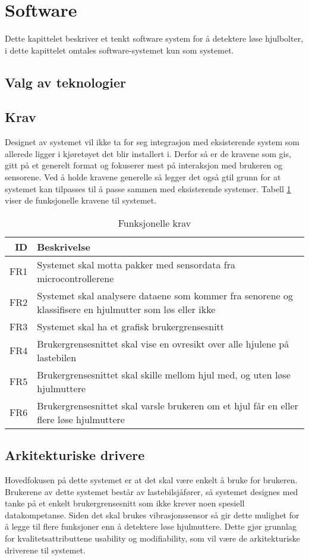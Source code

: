 \section{Software}
Dette kapittelet beskriver et tenkt software system for å detektere løse hjulbolter, i dette kapittelet omtales software-systemet kun som systemet.

\subsection{Valg av teknologier}

\subsection{Krav}
Designet av systemet vil ikke ta for seg integrasjon med eksisterende system som allerede ligger i kjøretøyet det blir installert i. Derfor så er de kravene som gis, gitt på et generelt format og fokuserer mest på interaksjon med brukeren og sensorene. Ved å holde kravene generelle så legger det også gtil grunn for at systemet kan tilpasses til å passe sammen med eksisterende systemer. Tabell \ref{tab:frequirements} viser de funksjonelle kravene til systemet.
\begin{table}[h]
\caption{Funksjonelle krav}
\label{tab:frequirements}
\begin{tabularx}{\textwidth}{r|X}
ID & Beskrivelse \\ 
\hline
FR1 & Systemet skal motta pakker med sensordata fra microcontrollerene \\
FR2 & Systemet skal analysere dataene som kommer fra senorene og klassifisere en hjulmutter som løs eller ikke \\
FR3 & Systemet skal ha et grafisk brukergrensesnitt \\
FR4 & Brukergrensesnittet skal vise en ovresikt over alle hjulene på lastebilen \\
FR5 & Brukergrensesnittet skal skille mellom hjul med, og uten løse hjulmuttere \\
FR6 & Brukergrensesnittet skal varsle brukeren om et hjul får en eller flere løse hjulmuttere \\
\hline
\end{tabularx}
\end{table}

\subsection{Arkitekturiske drivere}
Hovedfokusen på dette systemet er at det skal være enkelt å bruke for brukeren. Brukerene av dette systemet består av lastebilsjåfører, så systemet designes med tanke på et enkelt brukergrensesnitt som ikke krever noen spesiell datakompetanse. Siden det skal brukes vibrasjonssensor så gir dette mulighet for å legge til flere funksjoner enn å detektere løse hjulmuttere. Dette gjør grunnlag for kvalitetsattributtene usability og modifiability, som vil være de arkitekturiske driverene til systemet.

